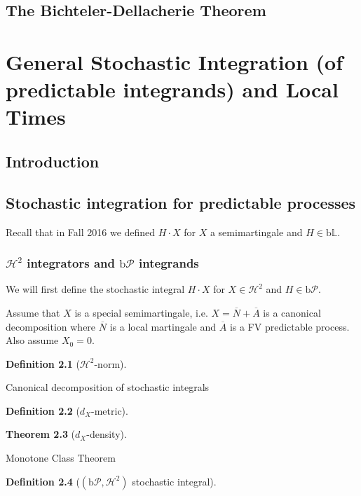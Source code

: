\documentclass[openany,oneside]{book}
\newtheorem{thm}{Theorem}[section]
\theoremstyle{definition}
\newtheorem{defn}[thm]{Definition}
\theoremstyle{remark}
\newcommand{\sH}[1][2]{\mathcal{H}^{#1}} %
\newcommand{\pred}{\mathcal{P}} %
\newcommand{\bP}{\mathrm{b}\pred} %
\renewcommand{\L}{\mathbb{L}} %
\newcommand{\bL}{\mathrm{b}\L} %
\begin{document}
\section{The Bichteler-Dellacherie Theorem}


\chapter{General Stochastic Integration (of predictable integrands) and Local Times}

\section{Introduction}

\section{Stochastic integration for predictable processes}
Recall that in Fall 2016 we defined $H\cdot X$ for $X$ a semimartingale and $H\in \bL$.

\subsection{$\sH$ integrators and $\bP$ integrands}
We will first define the stochastic integral $H\cdot X$ for $X\in \sH$ and $H\in \bP$.

\par
Assume that $X$ is a special semimartingale, i.e. $X=\overline{N}+\overline{A}$ is a canonical decomposition where $\overline{N}$ is a local martingale and $\overline{A}$ is a FV predictable process. Also assume $X_0=0$.

\begin{defn}[$\sH$-norm]

\end{defn}

Canonical decomposition of stochastic integrals

\begin{defn}[$d_X$-metric]

\end{defn}

\begin{thm}[$d_X$-density]

\end{thm}
Monotone Class Theorem

\begin{defn}[$(\bP,\sH)$ stochastic integral]

\end{defn}
\end{document}
